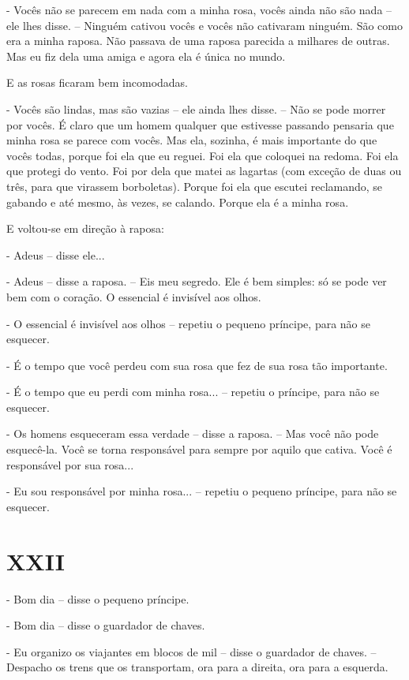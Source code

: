 - Vocês não se parecem em nada com a minha rosa, vocês ainda não são
nada -- ele lhes disse. -- Ninguém cativou vocês e vocês não cativaram
ninguém. São como era a minha raposa. Não passava de uma raposa parecida
a milhares de outras. Mas eu fiz dela uma amiga e agora ela é única no
mundo.

E as rosas ficaram bem incomodadas.

- Vocês são lindas, mas são vazias -- ele ainda lhes disse. -- Não se
pode morrer por vocês. É claro que um homem qualquer que estivesse
passando pensaria que minha rosa se parece com vocês. Mas ela, sozinha,
é mais importante do que vocês todas, porque foi ela que eu reguei. Foi
ela que coloquei na redoma. Foi ela que protegi do vento. Foi por dela
que matei as lagartas (com exceção de duas ou três, para que virassem
borboletas). Porque foi ela que escutei reclamando, se gabando e até
mesmo, às vezes, se calando. Porque ela é a minha rosa.

E voltou-se em direção à raposa:

- Adeus -- disse ele...

- Adeus -- disse a raposa. -- Eis meu segredo. Ele é bem simples: só se
pode ver bem com o coração. O essencial é invisível aos olhos.

- O essencial é invisível aos olhos -- repetiu o pequeno príncipe, para
não se esquecer.

- É o tempo que você perdeu com sua rosa que fez de sua rosa tão
importante.

- É o tempo que eu perdi com minha rosa... -- repetiu o príncipe, para
não se esquecer.

- Os homens esqueceram essa verdade -- disse a raposa. -- Mas você não
pode esquecê-la. Você se torna responsável para sempre por aquilo que
cativa. Você é responsável por sua rosa...

- Eu sou responsável por minha rosa... -- repetiu o pequeno príncipe,
para não se esquecer.

\chapter{XXII}

- Bom dia -- disse o pequeno príncipe.

- Bom dia -- disse o guardador de chaves.

- Eu organizo os viajantes em blocos de mil -- disse o guardador de
chaves. -- Despacho os trens que os transportam, ora para a direita, ora
para a esquerda.

